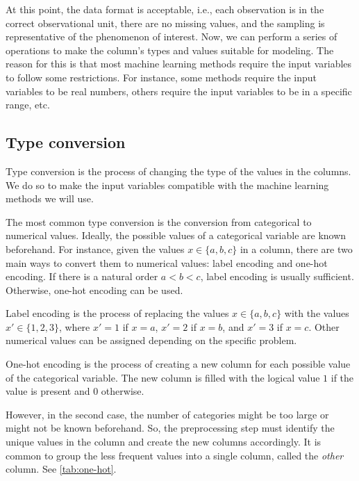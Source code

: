 At this point, the data format is acceptable, i.e., each observation is in the correct
observational unit, there are no missing values, and the sampling is representative of the
phenomenon of interest.  Now, we can perform a series of operations to make the
column's types and values suitable for modeling.  The reason for this is that most
machine learning methods require the input variables to follow some restrictions.  For
instance, some methods require the input variables to be real numbers, others require the
input variables to be in a specific range, etc.

\subsection{Type conversion}

Type conversion is the process of changing the type of the values in the columns.  We do
so to make the input variables compatible with the machine learning methods we will use.

The most common type conversion is the conversion from categorical to numerical values.
Ideally, the possible values of a categorical variable are known beforehand.
For instance, given the values $x \in \{a, b, c\}$ in a column, there are two main ways to
convert them to numerical values: label encoding and one-hot encoding.  If there is a
natural order $a < b < c$, label encoding is usually sufficient.  Otherwise, one-hot encoding
can be used.

Label encoding is the process of replacing the values $x \in \{a, b, c\}$ with the values
$x' \in \{1, 2, 3\}$, where $x' = 1$ if $x = a$, $x' = 2$ if $x = b$, and $x' = 3$ if
$x = c$.  Other numerical values can be assigned depending on the specific problem.

One-hot encoding is the process of creating a new column for each possible value
of the categorical variable.  The new column is filled with the logical value $1$ if the
value is present and $0$ otherwise.

However, in the second case, the number of categories might be too large or might not be
known beforehand.  So, the preprocessing step must identify the unique values in the
column and create the new columns accordingly.  It is common to group the less frequent
values into a single column, called the \emph{other} column.  See \cref{tab:one-hot}.

